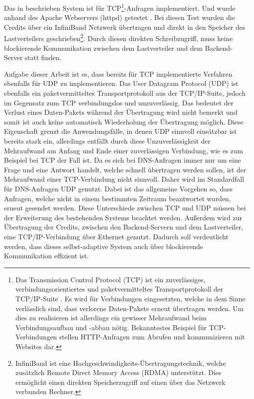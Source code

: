 \documentclass[a4paper, 12pt, BCOR10mm, DIV12, toc=bibliography, toc=listof, german]{scrbook}
\begin{document}
		Das in \cite{zinke2007,scsczile2008} beschrieben System ist für TCP\footnote{Das Transmission
		Control Protocol (TCP) \cite{rfc793} ist ein zuverlässiges, verbindungsorientiertes und
		paketvermitteltes Transportprotokoll der TCP/IP-Suite \cite{stevens1994}. Es wird für
		Verbindungen eingesetzten, welche in dem Sinne verlässlich sind, dass verlorene Daten-Pakete
		erneut übertragen werden. Um dies zu realisieren ist allerdings ein gewisser Mehraufwand beim
		Verbindungsaufbau und -abbau nötig.  Bekanntestes Beispiel für TCP-Verbindungen stellen
		HTTP-Anfragen zum Abrufen und kommunizieren mit Websites dar.}-Anfragen implementiert. Und wurde
		anhand des Apache Webservers (httpd) \cite{httpd} getestet \cite{zinke2012}. Bei diesen Test
		wurden die Credits über ein InfiniBand \cite{infiniband,zinke2007} Netzwerk übertragen und direkt
		in den Speicher des Lastverteilers geschrieben\footnote{InfiniBand \cite{infiniband} ist eine
		Hochgeschwindigkeits-Übertragungstechnik, welche zusätzlich Remote Direct Memory Access (RDMA)
		unterstützt. Dies ermöglicht einen direkten Speicherzugriff auf einen über das Netzwerk verbunden
		Rechner.}. Durch diesen direkten Schreibzugriff, muss keine blockierende Kommunikation zwischen dem
		Lastverteiler und dem Backend-Server statt finden.

		Aufgabe dieser Arbeit ist es, dass bereits für TCP implementierte Verfahren ebenfalls für UDP zu
		implementieren. Das User Datagram Protocol (UDP) \cite{stevens1994, rfc768} ist ebenfalls ein
		paketvermitteltes Transportprotokoll aus der TCP/IP-Suite, jedoch im Gegensatz zum TCP
		verbindungslos und unzuverlässig. Das bedeutet der Verlust eines Daten-Pakets während der
		Übertragung wird nicht bemerkt und somit ist auch keine automatisch Wiederholung der Übertragung
		möglich. Diese Eigenschaft grenzt die Anwendungsfälle, in denen UDP sinnvoll einsätzbar ist
		bereits stark ein, allerdings entfällt durch diese Unzuverlässigkeit der Mehraufwand am Anfang
		und Ende einer zuverlässigen Verbindung, wie es zum Beispiel bei TCP der Fall ist. Da es sich
		bei DNS-Anfragen immer nur um eine Frage und eine Antwort handelt, welche schnell übertragen
		werden sollen, ist der Mehraufwand einer TCP-Verbindung nicht sinnvoll. Daher wird im
		Standardfall für DNS-Anfragen UDP genutzt. Dabei ist das allgemeine Vorgehen so, dass Anfragen,
		welche nicht in einem bestimmten Zeitraum beantwortet wurden, erneut gesendet werden. Diese
		Unterschiede zwischen TCP und UDP müssen bei der Erweiterung des bestehenden Systems beachtet
		werden.  Außerdem wird zur Übertragung der Credits, zwischen den Backend-Servern und dem
		Lastverteiler, eine TCP/IP-Verbindung über Ethernet genutzt. Dadurch soll verdeutlicht werden,
		dass dieses selbst-adaptive System auch über blockierende Kommunikation effizient ist.
\end{document}
